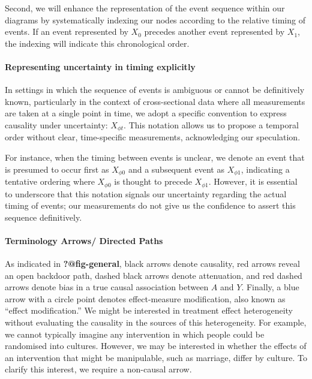 \documentclass[
  single column]{article}
\let\oldparagraph\paragraph
\renewcommand{\paragraph}[1]{\oldparagraph{#1}\mbox{}}
\begin{document}
Second, we will enhance the representation of the event sequence within
our diagrams by systematically indexing our nodes according to the
relative timing of events. If an event represented by \(X_0\) precedes
another event represented by \(X_1\), the indexing will indicate this
chronological order.

\paragraph{Representing uncertainty in timing
explicitly}\label{representing-uncertainty-in-timing-explicitly}

In settings in which the sequence of events is ambiguous or cannot be
definitively known, particularly in the context of cross-sectional data
where all measurements are taken at a single point in time, we adopt a
specific convention to express causality under uncertainty:
\(X_{\phi t}\). This notation allows us to propose a temporal order
without clear, time-specific measurements, acknowledging our
speculation.

For instance, when the timing between events is unclear, we denote an
event that is presumed to occur first as \(X_{\phi 0}\) and a subsequent
event as \(X_{\phi 1}\), indicating a tentative ordering where
\(X_{\phi 0}\) is thought to precede \(X_{\phi 1}\). However, it is
essential to underscore that this notation signals our uncertainty
regarding the actual timing of events; our measurements do not give us
the confidence to assert this sequence definitively.

\paragraph{Terminology Arrows/ Directed
Paths}\label{terminology-arrows-directed-paths}

As indicated in \textbf{?@fig-general}, black arrows denote causality,
red arrows reveal an open backdoor path, dashed black arrows denote
attenuation, and red dashed arrows denote bias in a true causal
association between \(A\) and \(Y\). Finally, a blue arrow with a circle
point denotes effect-measure modification, also known as ``effect
modification.'' We might be interested in treatment effect heterogeneity
without evaluating the causality in the sources of this heterogeneity.
For example, we cannot typically imagine any intervention in which
people could be randomised into cultures. However, we may be interested
in whether the effects of an intervention that might be manipulable,
such as marriage, differ by culture. To clarify this interest, we
require a non-causal arrow.
\end{document}

